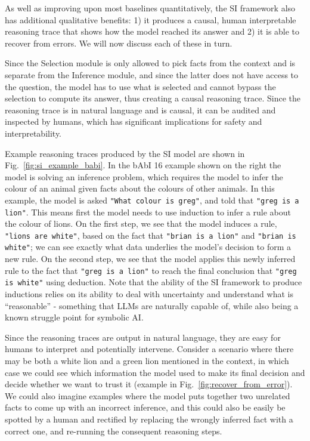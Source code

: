 As well as improving upon most baselines quantitatively, the SI framework also has additional qualitative benefits: 1) it produces a causal, human interpretable reasoning trace that shows how the model reached its answer and 2) it is able to recover from errors. We will now discuss each of these in turn. 

Since the Selection module is only allowed to pick facts from the context and is separate from the Inference module, and since the latter does not have access to the question, the model has to use what is selected and cannot bypass the selection to compute its answer, thus creating a causal reasoning trace. Since the reasoning trace is in natural language and is causal, it can be audited and inspected by humans, which has significant implications for safety and interpretability. 

Example reasoning traces produced by the SI model are shown in Fig.~\ref{fig:si_example_babi}. In the bAbI 16 example shown on the right the model is solving an inference problem, which requires the model to infer the colour of an animal given facts about the colours of other animals. In this example, the model is asked \texttt{"What colour is greg"}, and told that \texttt{"greg is a lion"}. This means first the model needs to use induction to infer a rule about the colour of lions. On the first step, we see that the model induces a rule, \texttt{"lions are white"}, based on the fact that \texttt{"brian is a lion"} and \texttt{"brian is white"}; we can see exactly what data underlies the model's decision to form a new rule. On the second step, we see that the model applies this newly inferred rule to the fact that \texttt{"greg is a lion"} to reach the final conclusion that \texttt{"greg is white"} using deduction. Note that the ability of the SI framework to produce inductions relies on its ability to deal with uncertainty and understand what is ``reasonable'' - something that LLMs are naturally capable of, while also being a known struggle point for symbolic AI. 

Since the reasoning traces are output in natural language, they are easy for humans to interpret and potentially intervene. Consider a scenario where there may be both a white lion and a green lion mentioned in the context, in which case we could see which information the model used to make its final decision and decide whether we want to trust it (example in Fig.~\ref{fig:recover_from_error}). We could also imagine examples where the model puts together two unrelated facts to come up with an incorrect inference, and this could also be easily be spotted by a human and rectified by replacing the wrongly inferred fact with a correct one, and re-running the consequent reasoning steps. 

